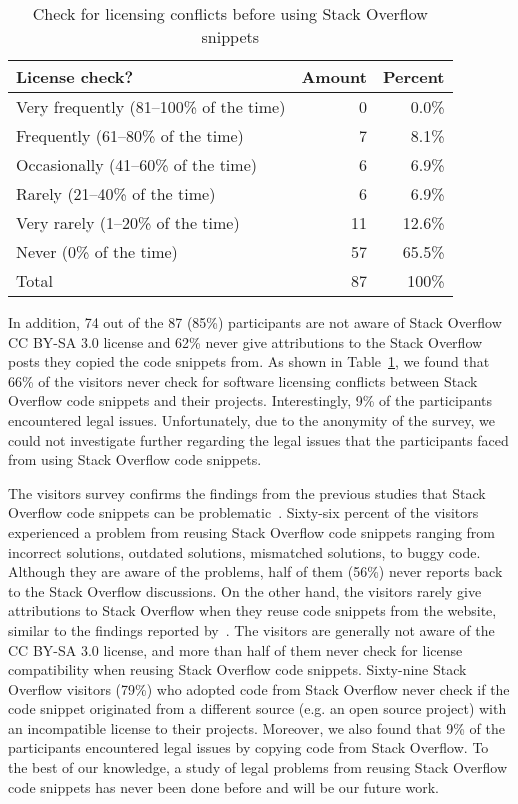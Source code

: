 \documentclass[a4paper,twoside,10pt]{reviewresponse}
\begin{document}
\begin{table}
	\centering
	\caption{Check for licensing conflicts before using Stack Overflow snippets}
	\label{tab:visitor_survey_license_check}
	\begin{tabular}{lrr}
		\toprule
		License check? & Amount & Percent \\
		\midrule
		Very frequently (81--100\% of the time) & 0 & 0.0\% \\
		Frequently (61--80\% of the time) & 7 & 8.1\%
\\
		Occasionally (41--60\% of the time) & 6 & 6.9\%
\\
		Rarely (21--40\% of the time) & 6 & 6.9\% \\
		Very rarely (1--20\% of the time) & 11 & 12.6\% \\
		Never (0\% of the time)	& 57 & 65.5\% \\
		\midrule
		Total & 87 & 100\% \\
		\bottomrule
	\end{tabular}
\end{table}

In addition, 74 out of the 87 (85\%) participants are not
aware of Stack Overflow CC BY-SA 3.0 license and 62\% never give attributions to
the Stack Overflow posts they copied the code snippets from. 
As shown in Table~\ref{tab:visitor_survey_license_check}, we found that 66\%
of the visitors never check for software licensing conflicts between Stack
Overflow code snippets and their projects. Interestingly, 9\% of the
participants encountered legal issues. Unfortunately, due to the anonymity of
the survey, we could not investigate further regarding the legal issues that the
participants faced from using Stack Overflow code snippets.

The visitors survey confirms the findings from the previous studies that Stack
Overflow code snippets can be problematic~\citep{Zhang2018,Acar2016,An2017}. Sixty-six
percent of the visitors experienced a problem from reusing Stack Overflow code
snippets ranging from incorrect solutions, outdated solutions, mismatched
solutions, to buggy code. Although they are aware of the problems, half of them
(56\%) never reports back to the Stack Overflow discussions. On the other hand,
the visitors rarely give attributions to Stack Overflow when they reuse code
snippets from the website, similar to the findings reported
by~\cite{Baltes2017}. The visitors are generally not aware of the CC BY-SA 3.0
license, and more than half of them never check for license compatibility when
reusing Stack Overflow code snippets. 
Sixty-nine Stack Overflow visitors (79\%) who adopted code from Stack Overflow never 
check if the code snippet originated from a different source (e.g. an open source project) 
with an incompatible license to their projects.
Moreover, we also found that 9\% of the participants
encountered legal issues by copying code from Stack Overflow. To the best of our
knowledge, a study of legal problems from reusing Stack Overflow code snippets
has never been done before and will be our future work.
\end{document}
